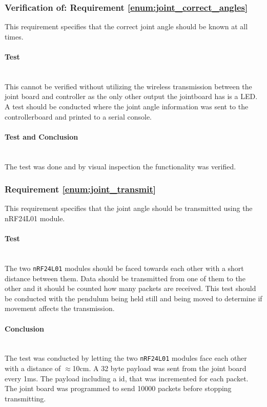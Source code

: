 {\subsubsection{Verification of: Requirement \ref{enum:joint_correct_angles}} %
\label{ssub:requirement_enum:correct_angles}
This requirement specifies that the correct joint angle should be known at all times.

\paragraph{Test}~\\
This cannot be verified without utilizing the wireless transmission between the joint board and controller as the only other output the jointboard has is a LED.
A test should be conducted where the joint angle information was sent to the controllerboard and printed to a serial console.

\paragraph{Test and Conclusion}~\\
The test was done and by visual inspection the functionality was verified.

\subsubsection{Requirement \ref{enum:joint_transmit}} %
\label{ssub:requirement_enum:joint_transmit}
This requirement specifies that the joint angle should be transmitted using the nRF24L01 module.

\paragraph{Test}~\\
The two \texttt{nRF24L01} modules should be faced towards each other with a short distance between them.
Data should be transmitted from one of them to the other and it should be counted how many packets are received.
This test should be conducted with the pendulum being held still and being moved to determine if movement affects the transmission.

\paragraph{Conclusion}~\\
The test was conducted by letting the two \texttt{nRF24L01} modules face each other with a distance of $\approx$10cm.
A 32 byte payload was sent from the joint board every 1ms. 
The payload including a id, that was incremented for each packet.
The joint board was programmed to send 10000 packets before stopping transmitting. 

}
